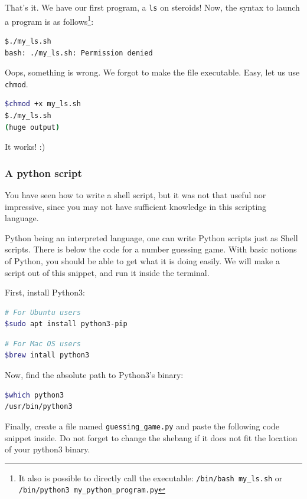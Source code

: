 \documentclass[12pt]{article}
\begin{document}
That's it. We have our first program, a \texttt{ls} on steroids! Now, the syntax to launch a program is as follows\footnote{It also is possible to directly call the executable: \texttt{/bin/bash my\_ls.sh} or \texttt{/bin/python3 my\_python\_program.py}}:

\begin{lstlisting}[language=bash]
$./my_ls.sh
bash: ./my_ls.sh: Permission denied
\end{lstlisting}

Oops, something is wrong. We forgot to make the file executable. Easy, let us use \texttt{chmod}.

\begin{lstlisting}[language=bash]
$chmod +x my_ls.sh 
$./my_ls.sh
(huge output)
\end{lstlisting}

It works! :)

\subsubsection{A python script}

You have seen how to write a shell script, but it was not that useful nor impressive, since you may not have sufficient knowledge in this scripting language.

Python being an interpreted language, one can write Python scripts just as Shell scripts. There is below the code for a number guessing game. With basic notions of Python, you should be able to get what it is doing easily. We will make a script out of this snippet, and run it inside the terminal.

First, install Python3:

\begin{lstlisting}[language=bash]
# For Ubuntu users
$sudo apt install python3-pip
\end{lstlisting}

\begin{lstlisting}[language=bash]
# For Mac OS users
$brew intall python3
\end{lstlisting}

Now, find the absolute path to Python3's binary:

\begin{lstlisting}[language=bash]
$which python3
/usr/bin/python3
\end{lstlisting}

Finally, create a file named \texttt{guessing\_game.py} and paste the following code snippet inside. Do not forget to change the shebang if it does not fit the location of your python3 binary.
\end{document}
